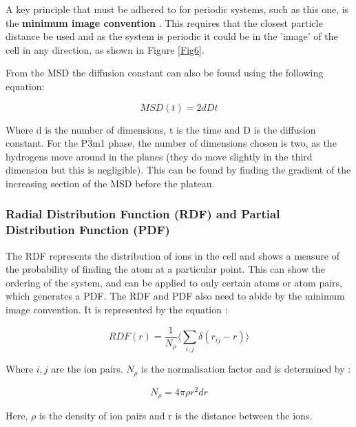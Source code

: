 \documentclass[a4paper,12pt]{article}
\begin{document}
A key principle that must be adhered to for periodic systems, such as this one, is the \textbf{minimum image convention} \cite{Compmod}. This requires that the closest particle distance be used and as the system is periodic it could be in the 'image' of the cell in any direction, as shown in Figure \ref{Fig6}. 

From the MSD the diffusion constant can also be found using the following equation:

\begin{equation}
MSD(t) = 2dDt
\end{equation}

Where d is the number of dimensions, t is the time and D is the diffusion constant. For the P$\bar3$m1 phase, the number of dimensions chosen is two, as the hydrogens move around in the planes (they do move slightly in the third dimension but this is negligible). This can be found by finding the gradient of the increasing section of the MSD before the plateau.

\subsubsection{Radial Distribution Function (RDF) and Partial Distribution Function (PDF)}

The RDF represents the distribution of ions in the cell and shows a measure of the probability of finding the atom at a particular point. This can show the ordering of the system, and can be applied to only certain atoms or atom pairs, which generates a PDF. The RDF and PDF also need to abide by the minimum image convention. It is represented by the equation \cite{Compmod}:

\begin{equation}
RDF(r) = \frac{1}{N_\rho} \langle \sum_{i,j}^{} \delta (r_{ij} - r) \rangle
\end{equation}

Where $i,j$ are the ion pairs. $N_\rho$ is the normalisation factor and is determined by \cite{Compmod}:

\medskip
\begin{equation}
N_\rho = 4\pi \rho r^2 dr
\end{equation}
\medskip

Here, $\rho$ is the density of ion pairs and r is the distance between the ions.


\newpage
\end{document}
